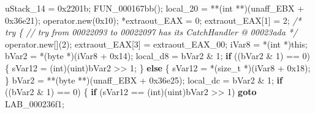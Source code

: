 \documentclass[
]{article}
\newenvironment{Shaded}{}{}
\newcommand{\BaseNTok}[1]{\textcolor[rgb]{0.25,0.63,0.44}{#1}}
\newcommand{\CommentTok}[1]{\textcolor[rgb]{0.38,0.63,0.69}{\textit{#1}}}
\newcommand{\ControlFlowTok}[1]{\textcolor[rgb]{0.00,0.44,0.13}{\textbf{#1}}}
\newcommand{\DataTypeTok}[1]{\textcolor[rgb]{0.56,0.13,0.00}{#1}}
\newcommand{\DecValTok}[1]{\textcolor[rgb]{0.25,0.63,0.44}{#1}}
\newcommand{\NormalTok}[1]{#1}
\newcommand{\OperatorTok}[1]{\textcolor[rgb]{0.40,0.40,0.40}{#1}}
\begin{document}
\begin{Shaded}
\begin{Highlighting}[]
\NormalTok{  uStack\_14 }\OperatorTok{=} \BaseNTok{0x2201b}\OperatorTok{;}
\NormalTok{  FUN\_000167bb}\OperatorTok{();}
\NormalTok{  local\_20 }\OperatorTok{=} \OperatorTok{**(}\DataTypeTok{int} \OperatorTok{**)(}\NormalTok{unaff\_EBX }\OperatorTok{+} \BaseNTok{0x36e21}\OperatorTok{);}
\NormalTok{  operator}\OperatorTok{.}\NormalTok{new}\OperatorTok{(}\BaseNTok{0x10}\OperatorTok{);}
  \OperatorTok{*}\NormalTok{extraout\_EAX }\OperatorTok{=} \DecValTok{0}\OperatorTok{;}
\NormalTok{  extraout\_EAX}\OperatorTok{[}\DecValTok{1}\OperatorTok{]} \OperatorTok{=} \DecValTok{2}\OperatorTok{;}
                    \CommentTok{/* try \{ // try from 00022093 to 00022097 has its CatchHandler @ 00023ada */}
\NormalTok{  operator}\OperatorTok{.}\NormalTok{new}\OperatorTok{[](}\DecValTok{2}\OperatorTok{);}
\NormalTok{  extraout\_EAX}\OperatorTok{[}\DecValTok{3}\OperatorTok{]} \OperatorTok{=}\NormalTok{ extraout\_EAX\_00}\OperatorTok{;}
\NormalTok{  iVar8 }\OperatorTok{=} \OperatorTok{*(}\DataTypeTok{int} \OperatorTok{*)}\NormalTok{this}\OperatorTok{;}
\NormalTok{  bVar2 }\OperatorTok{=} \OperatorTok{*(}\NormalTok{byte }\OperatorTok{*)(}\NormalTok{iVar8 }\OperatorTok{+} \BaseNTok{0x14}\OperatorTok{);}
\NormalTok{  local\_d8 }\OperatorTok{=}\NormalTok{ bVar2 }\OperatorTok{\&} \DecValTok{1}\OperatorTok{;}
  \ControlFlowTok{if} \OperatorTok{((}\NormalTok{bVar2 }\OperatorTok{\&} \DecValTok{1}\OperatorTok{)} \OperatorTok{==} \DecValTok{0}\OperatorTok{)} \OperatorTok{\{}
\NormalTok{    sVar12 }\OperatorTok{=} \OperatorTok{(}\DataTypeTok{int}\OperatorTok{)(}\NormalTok{uint}\OperatorTok{)}\NormalTok{bVar2 }\OperatorTok{\textgreater{}\textgreater{}} \DecValTok{1}\OperatorTok{;}
  \OperatorTok{\}}
  \ControlFlowTok{else} \OperatorTok{\{}
\NormalTok{    sVar12 }\OperatorTok{=} \OperatorTok{*(}\DataTypeTok{size\_t} \OperatorTok{*)(}\NormalTok{iVar8 }\OperatorTok{+} \BaseNTok{0x18}\OperatorTok{);}
  \OperatorTok{\}}
\NormalTok{  bVar2 }\OperatorTok{=} \OperatorTok{**(}\NormalTok{byte }\OperatorTok{**)(}\NormalTok{unaff\_EBX }\OperatorTok{+} \BaseNTok{0x36e25}\OperatorTok{);}
\NormalTok{  local\_dc }\OperatorTok{=}\NormalTok{ bVar2 }\OperatorTok{\&} \DecValTok{1}\OperatorTok{;}
  \ControlFlowTok{if} \OperatorTok{((}\NormalTok{bVar2 }\OperatorTok{\&} \DecValTok{1}\OperatorTok{)} \OperatorTok{==} \DecValTok{0}\OperatorTok{)} \OperatorTok{\{}
    \ControlFlowTok{if} \OperatorTok{(}\NormalTok{sVar12 }\OperatorTok{==} \OperatorTok{(}\DataTypeTok{int}\OperatorTok{)(}\NormalTok{uint}\OperatorTok{)}\NormalTok{bVar2 }\OperatorTok{\textgreater{}\textgreater{}} \DecValTok{1}\OperatorTok{)} \ControlFlowTok{goto}\NormalTok{ LAB\_000236f1}\OperatorTok{;}

\end{Highlighting}
\end{Shaded}
\end{document}
